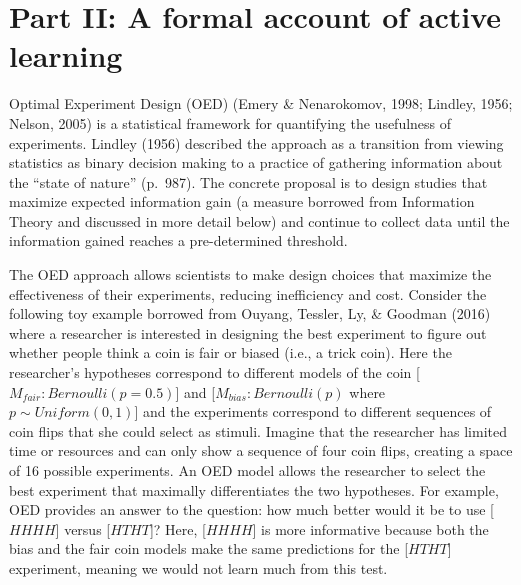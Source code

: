\documentclass[oneside]{report}
\begin{document}
\hypertarget{oed}{\section{Part II: A formal account of active
learning}\label{oed}}

Optimal Experiment Design (OED) (Emery \& Nenarokomov, 1998; Lindley,
1956; Nelson, 2005) is a statistical framework for quantifying the
usefulness of experiments. Lindley (1956) described the approach as a
transition from viewing statistics as binary decision making to a
practice of gathering information about the ``state of nature''
(p.~987). The concrete proposal is to design studies that maximize
expected information gain (a measure borrowed from Information Theory
and discussed in more detail below) and continue to collect data until
the information gained reaches a pre-determined threshold.

The OED approach allows scientists to make design choices that maximize
the effectiveness of their experiments, reducing inefficiency and cost.
Consider the following toy example borrowed from Ouyang, Tessler, Ly, \&
Goodman (2016) where a researcher is interested in designing the best
experiment to figure out whether people think a coin is fair or biased
(i.e., a trick coin). Here the researcher's hypotheses correspond to
different models of the coin {[}\(M_{fair}: Bernoulli(p = 0.5)\){]} and
{[}\(M_{bias}: Bernoulli(p)\) where \(p \sim Uniform(0,1)\){]} and the
experiments correspond to different sequences of coin flips that she
could select as stimuli. Imagine that the researcher has limited time or
resources and can only show a sequence of four coin flips, creating a
space of 16 possible experiments. An OED model allows the researcher to
select the best experiment that maximally differentiates the two
hypotheses. For example, OED provides an answer to the question: how
much better would it be to use {[}\(HHHH\){]} versus {[}\(HTHT\){]}?
Here, {[}\(HHHH\){]} is more informative because both the bias and the
fair coin models make the same predictions for the {[}\(HTHT\){]}
experiment, meaning we would not learn much from this test.
\end{document}
